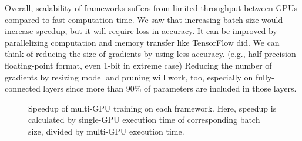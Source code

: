 Overall, scalability of frameworks suffers from limited throughput between GPUs compared to fast computation time.
We saw that increasing batch size would increase speedup, but it will require loss in accuracy.
It can be improved by parallelizing computation and memory transfer like TensorFlow did.
We can think of reducing the size of gradients by using less accuracy. (e.g., half-precision floating-point format, even 1-bit in extreme case\cite{1-bit-stochastic-gradient-descent-and-application-to-data-parallel-distributed-training-of-speech-dnns})
Reducing the number of gradients by resizing model and pruning will work, too, especially on fully-connected layers since more than 90\% of parameters are included in those layers.

\begin{figure}[]
  \centering
  \hfil
  \caption{%
Speedup of multi-GPU training on each framework.
Here, speedup is calculated by single-GPU execution time of corresponding batch size, divided by multi-GPU execution time.
}
  \label{fig_mg}
\end{figure}

